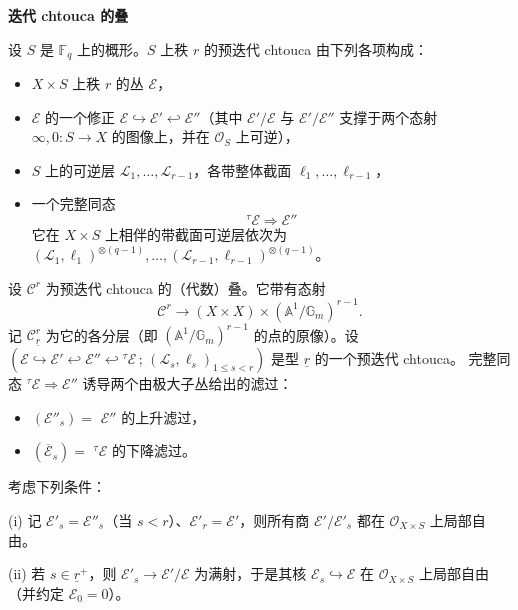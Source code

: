 \par\medskip
\noindent\textbf{迭代 chtouca 的叠}
\par\medskip

\begin{definition*}
设 $S$ 是 $\mathbb{F}_q$ 上的概形。$S$ 上秩 $r$ 的预迭代 chtouca 由下列各项构成：

\begin{itemize}
\item $X\times S$ 上秩 $r$ 的丛 $\mathcal{E}$，
\item $\mathcal{E}$ 的一个修正 $\mathcal{E}\hookrightarrow\mathcal{E}'\hookleftarrow\mathcal{E}''$（其中 $\mathcal{E}'/\mathcal{E}$ 与 $\mathcal{E}'/\mathcal{E}''$ 支撑于两个态射 $\infty,0:S\to X$ 的图像上，并在 $\mathcal{O}_S$ 上可逆），
\item $S$ 上的可逆层 $\mathcal{L}_1,\ldots,\mathcal{L}_{r-1}$，各带整体截面 $\ell_1,\ldots,\ell_{r-1}$，
\item 一个完整同态
\[
{}^\tau\mathcal{E}\Rightarrow\mathcal{E}''
\]
它在 $X\times S$ 上相伴的带截面可逆层依次为 $(\mathcal{L}_1,\ell_1)^{\otimes(q-1)},\ldots,(\mathcal{L}_{r-1},\ell_{r-1})^{\otimes(q-1)}$。
\end{itemize}
\end{definition*}

设 $\mathcal{C}^r$ 为预迭代 chtouca 的（代数）叠。它带有态射
\[
\mathcal{C}^r\to(X\times X)\times(\mathbb{A}^1/\mathbb{G}_m)^{r-1}.
\]
记 $\mathcal{C}^r_{\underline{r}}$ 为它的各分层（即 $(\mathbb{A}^1/\mathbb{G}_m)^{r-1}$ 的点的原像）。设 $(\mathcal{E}\hookrightarrow\mathcal{E}'\hookleftarrow\mathcal{E}''\hookleftarrow{}^\tau\mathcal{E}\,;\,(\mathcal{L}_s,\ell_s)_{1\le s<r})$ 是型 $\underline{r}$ 的一个预迭代 chtouca。
完整同态 ${}^\tau\mathcal{E}\Rightarrow\mathcal{E}''$ 诱导两个由极大子丛给出的滤过：

\begin{itemize}
\item $(\mathcal{E}''_s)=$ $\mathcal{E}''$ 的上升滤过，
\item $(\overline{\mathcal{E}}_s)=$ ${}^\tau\mathcal{E}$ 的下降滤过。
\end{itemize}

考虑下列条件：

(i) 记 $\mathcal{E}'_s=\mathcal{E}''_s$（当 $s<r$）、$\mathcal{E}'_r=\mathcal{E}'$，则所有商 $\mathcal{E}'/\mathcal{E}'_s$ 都在 $\mathcal{O}_{X\times S}$ 上局部自由。

(ii) 若 $s\in\underline{r}^+$，则 $\mathcal{E}'_s\to\mathcal{E}'/\mathcal{E}$ 为满射，于是其核 $\mathcal{E}_s\hookrightarrow\mathcal{E}$ 在 $\mathcal{O}_{X\times S}$ 上局部自由（并约定 $\mathcal{E}_0=0$）。

